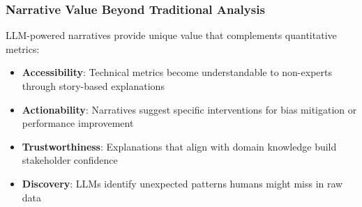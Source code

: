\subsubsection{Narrative Value Beyond Traditional Analysis}

LLM-powered narratives provide unique value that complements quantitative metrics:

\begin{itemize}
    \item \textbf{Accessibility}: Technical metrics become understandable to non-experts through story-based explanations
    \item \textbf{Actionability}: Narratives suggest specific interventions for bias mitigation or performance improvement
    \item \textbf{Trustworthiness}: Explanations that align with domain knowledge build stakeholder confidence
    \item \textbf{Discovery}: LLMs identify unexpected patterns humans might miss in raw data
\end{itemize}

%  
% 

% 
% 
% 
% 
% 

